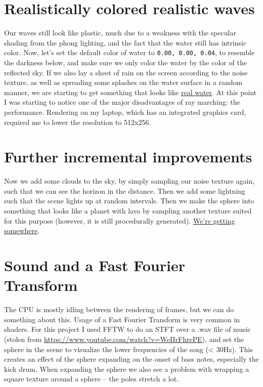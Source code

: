 \documentclass[abstract=off,oneside]{scrreprt}
\begin{document}
\section*{Realistically colored realistic waves}
\label{sec-10}
\label{sec:realisticcolor}
Our waves still look like plastic, much due to a weakness with the
specular shading from the phong lighting, and the fact that the water
still has intrinsic color. Now, let's set the default color of water
to \verb~0.00, 0.00, 0.04~, to resemble the darkness below, and make sure
we only color the water by the color of the reflected sky. If we also
lay a sheet of rain on the screen according to the noise texture, as
well as spreading some splashes on the water surface in a random
manner, we are starting to get something that looks like \hyperref[fig:okwater]{real
water}. At this point I was starting to notice one of the major
disadvantages of ray marching: the performance. Rendering on my
laptop, which has an integrated graphics card, required me to lower
the resolution to 512x256.

\section*{Further incremental improvements}
\label{sec-11}
\label{sec:furtherimprovements}
Now we add some clouds to the sky, by simply sampling our noise
texture again, such that we can see the horizon in the distance. Then
we add some lightning such that the scene lights up at random
intervals. Then we make the sphere into something that looks like a
planet with lava by sampling another texture suited for this purpose
(however, it is still procedurally generated). \hyperref[fig:improvements]{We're getting
somewhere}.

\section*{Sound and a Fast Fourier Transform}
\label{sec-12}
\label{sec:sound}
The CPU is mostly idling between the rendering of frames, but we can
do something about this. Usage of a Fast Fourier Transform is very
common in shaders. For this project I used FFTW to do an STFT over a
.wav file of music (stolen from
\url{https://www.youtube.com/watch?v=WeIIrFhrePE}), and set the sphere in
the scene to visualize the lower frequencies of the song (<
30Hz). This creates an effect of the sphere expanding on the onset of
bass notes, especially the kick drum. When expanding the sphere we
also see a problem with wrapping a square texture around a sphere --
the poles stretch a lot.
\end{document}
